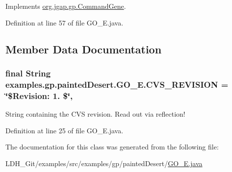 Implements \hyperlink{classorg_1_1jgap_1_1gp_1_1_command_gene_a236141d99059da808afe7a9217e411c7}{org.\-jgap.\-gp.\-Command\-Gene}.



Definition at line 57 of file G\-O\-\_\-\-E.\-java.



\subsection{Member Data Documentation}
\hypertarget{classexamples_1_1gp_1_1painted_desert_1_1_g_o___e_a5bc33515947936865e03b089e63d8c0d}{
\subsubsection[{C\-V\-S\-\_\-\-R\-E\-V\-I\-S\-I\-O\-N}]{\setlength{\rightskip}{0pt plus 5cm}final String examples.\-gp.\-painted\-Desert.\-G\-O\-\_\-\-E.\-C\-V\-S\-\_\-\-R\-E\-V\-I\-S\-I\-O\-N = \char`\"{}\$Revision\-: 1. \$\char`\"{}\hspace{0.3cm}{\ttfamily [static]}, {\ttfamily [private]}}}\label{classexamples_1_1gp_1_1painted_desert_1_1_g_o___e_a5bc33515947936865e03b089e63d8c0d}
String containing the C\-V\-S revision. Read out via reflection! 

Definition at line 25 of file G\-O\-\_\-\-E.\-java.



The documentation for this class was generated from the following file\-:\begin{DoxyCompactItemize}
\item 
L\-D\-H\-\_\-\-Git/examples/src/examples/gp/painted\-Desert/\hyperlink{_g_o___e_8java}{G\-O\-\_\-\-E.\-java}\end{DoxyCompactItemize}
